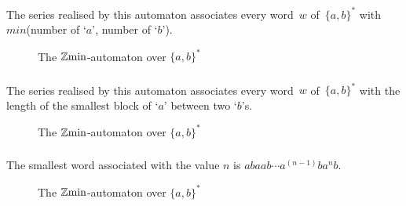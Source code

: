 \Comt
The series realised by this automaton associates every word~$w$
of~$\{a,b\}^{*}$ with $min$(number of `$a$', number of `$b$').

\begin{figure}[ht]
\centering
{}%
\caption{The $\mathbb{Z}\mathrm{min}$-automaton  over $\{a,b\}^*$}
\label{fig:minab-app}
\end{figure}

\subsubsection{}

\Comt
The series realised by this automaton associates every word~$w$
of~$\{a,b\}^{*}$ with the length of the smallest block of `$a$' between two `$b$'s.

\begin{figure}[ht]
\centering
{}%
\caption{The $\mathbb{Z}\mathrm{min}$-automaton  over $\{a,b\}^*$}
\label{fig:minblocka-app}
\end{figure}

\subsubsection{}

\Comt
The smallest word associated with the value $n$ is $abaab\cdots a^{(n-1)} b a^n b$.

\begin{figure}[ht]
\centering
{}%
\caption{The $\mathbb{Z}\mathrm{min}$-automaton  over $\{a,b\}^*$}
\label{fig:slowgrow-app}
\end{figure}

